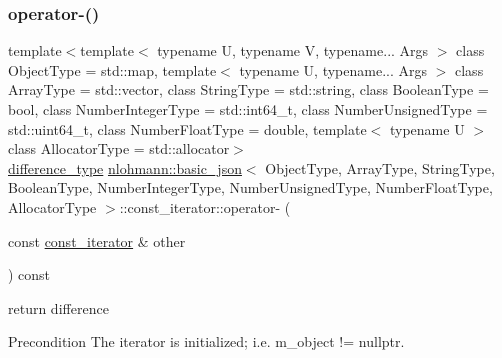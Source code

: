 \subsubsection{\texorpdfstring{operator-\/()}{operator-()}\hspace{0.1cm}{\footnotesize\ttfamily [2/2]}}
{\footnotesize\ttfamily template$<$template$<$ typename U, typename V, typename... Args $>$ class Object\+Type = std\+::map, template$<$ typename U, typename... Args $>$ class Array\+Type = std\+::vector, class String\+Type  = std\+::string, class Boolean\+Type  = bool, class Number\+Integer\+Type  = std\+::int64\+\_\+t, class Number\+Unsigned\+Type  = std\+::uint64\+\_\+t, class Number\+Float\+Type  = double, template$<$ typename U $>$ class Allocator\+Type = std\+::allocator$>$ \\
\hyperlink{classnlohmann_1_1basic__json_1_1const__iterator_a49d7c3e9ef3280df03052cce988b792f}{difference\+\_\+type} \hyperlink{classnlohmann_1_1basic__json}{nlohmann\+::basic\+\_\+json}$<$ Object\+Type, Array\+Type, String\+Type, Boolean\+Type, Number\+Integer\+Type, Number\+Unsigned\+Type, Number\+Float\+Type, Allocator\+Type $>$\+::const\+\_\+iterator\+::operator-\/ (\begin{DoxyParamCaption}\item[{const \hyperlink{classnlohmann_1_1basic__json_1_1const__iterator}{const\+\_\+iterator} \&}]{other }\end{DoxyParamCaption}) const\hspace{0.3cm}{\ttfamily [inline]}}



return difference 

\begin{DoxyPrecond}{Precondition}
The iterator is initialized; i.\+e. {\ttfamily m\+\_\+object != nullptr}. 
\end{DoxyPrecond}
\hypertarget{classnlohmann_1_1basic__json_1_1const__iterator_a6cab1c2ed7e2a014980e2a5717f43a64}{}\label{classnlohmann_1_1basic__json_1_1const__iterator_a6cab1c2ed7e2a014980e2a5717f43a64} 
